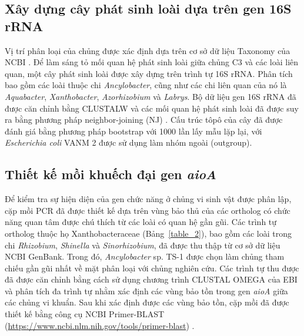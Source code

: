 \documentclass[journal]{IEEEtran}
\begin{document}
	\subsection{Xây dựng cây phát sinh loài dựa trên gen 16S rRNA}
	
	Vị trí phân loại của chủng được xác định dựa trên cơ sở dữ liệu Taxonomy của NCBI \cite{schoch2020ncbi}. Để làm sáng tỏ mối quan hệ phát sinh loài giữa chủng C3 và các loài liên quan, một cây phát sinh loài được xây dựng trên trình tự 16S rRNA. Phân tích bao gồm các loài thuộc chi \textit{Ancylobacter}, cũng như các chi liên quan của nó là \textit{Aquabacter}, \textit{Xanthobacter}, \textit{Azorhizobium} và \textit{Labrys}. Bộ dữ liệu gen 16S rRNA đã được căn chỉnh bằng {\footnotesize CLUSTALW} \cite{thompson1994clustal} và các mối quan hệ phát sinh loài đã được suy ra bằng phương pháp neighbor-joining (NJ) \cite{kumar2024mega12}. Cấu trúc tôpô của cây đã được đánh giá bằng phương pháp bootstrap với 1000 lần lấy mẫu lặp lại, với \textit{Escherichia coli} VANM 2 được sử dụng làm nhóm ngoài (outgroup). 
	
	\subsection{Thiết kế mồi khuếch đại gen \textit{aioA}}
	
	Để kiểm tra sự hiện diện của gen chức năng ở chủng vi sinh vật được phân lập, cặp mồi PCR đã được thiết kế dựa trên vùng bảo thủ của các ortholog có chức năng quan tâm được chú thích từ các loài có quan hệ gần gũi. Các trình tự ortholog thuộc họ Xanthobacteraceae (Bảng~\ref{table_2}), bao gồm các loài trong chi \textit{Rhizobium}, \textit{Shinella} và \textit{Sinorhizobium}, đã được thu thập từ cơ sở dữ liệu NCBI GenBank. Trong đó, \textit{Ancylobacter} sp. TS-1 được chọn làm chủng tham chiếu gần gũi nhất về mặt phân loại với chủng nghiên cứu. Các trình tự thu được đã được căn chỉnh bằng cách sử dụng chương trình {\footnotesize CLUSTAL OMEGA} của EBI \cite{sievers2011fast} và phân tích đa trình tự nhằm xác định các vùng bảo tồn trong gen \textit{aioA} giữa các chủng vi khuẩn. Sau khi xác định được các vùng bảo tồn, cặp mồi đã được thiết kế bằng công cụ NCBI Primer-BLAST (\href{https://www.ncbi.nlm.nih.gov/tools/primer-blast/index.cgi}{https://www.ncbi.nlm.nih.gov/tools/primer-blast}) \cite{ye2012primer}.
	
	\renewcommand{\arraystretch}{1.35}
	
\end{document}
